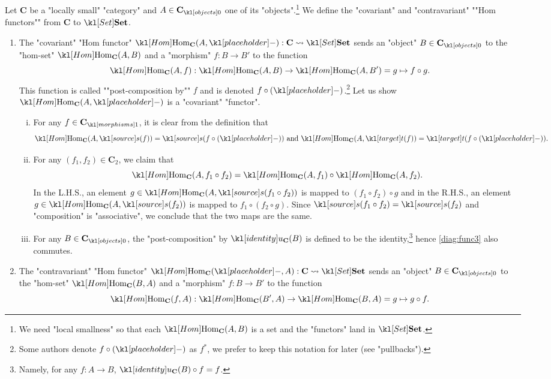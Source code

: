 \documentclass[main.tex]{subfiles}
\begin{document}
\begin{exmp}\label{exmp:homfunctor}
	\AP Let $\mathbf{C}$ be a "locally small" "category" and $A \in \obj{\mathbf{C}}$ one of its "objects".\footnote{We need "local smallness" so that each $\Hom_{\mathbf{C}}(A,B)$ is a set and the "functors" land in $\catSet$.} We define the "covariant" and "contravariant" ""Hom functors"" from $\mathbf{C}$ to $\catSet$.
	\begin{enumerate}
		\item The "covariant" "Hom functor" $\Hom_{\mathbf{C}}(A,\placeholder): \mathbf{C} \rightsquigarrow \catSet$ sends an "object" $B\in \obj{\mathbf{C}}$ to the "hom-set" $\Hom_{\mathbf{C}}(A,B)$ and a "morphism" $f:B\rightarrow B'$ to the function \[\Hom_{\mathbf{C}}(A,f): \Hom_{\mathbf{C}}(A,B) \rightarrow \Hom_{\mathbf{C}}(A,B') = g \mapsto f\circ g.\]
		\AP This function is called ""post-composition by"" $f$ and is denoted $f \circ (\placeholder)$.\footnote{Some authors denote $f \circ (\placeholder)$ as $f^*$, we prefer to keep this notation for later (see "pullbacks").} Let us show $\Hom_{\mathbf{C}}(A, \placeholder)$ is a "covariant" "functor".
		\begin{enumerate}[i.]
			\item For any $f \in \mor{\mathbf{C}}$, it is clear from the definition that \[\Hom_{\mathbf{C}}(A,\source(f)) = \source(f \circ (\placeholder)) \text{ and } \Hom_{\mathbf{C}}(A,\target(f)) = \target(f \circ (\placeholder)).\]
			\item For any $(f_1,f_2) \in \mathbf{C}_2$, we claim that \[\Hom_{\mathbf{C}}(A,f_1\circ f_2) = \Hom_{\mathbf{C}}(A,f_1)\circ \Hom_{\mathbf{C}}(A,f_2).\] In the L.H.S., an element $g \in \Hom_{\mathbf{C}}(A,\source(f_1\circ f_2))$ is mapped to $(f_1 \circ f_2) \circ g$ and in the R.H.S., an element $g \in \Hom_{\mathbf{C}}(A,\source(f_2))$ is mapped to $f_1\circ (f_2 \circ g)$. Since $\source(f_1 \circ f_2) = \source(f_2)$ and "composition" is "associative", we conclude that the two maps are the same.
			\item For any $B \in \obj{\mathbf{C}}$, the "post-composition" by $\idu_{\mathbf{C}}(B)$ is defined to be the identity,\footnote{Namely, for any $f: A \rightarrow B$, $\idu_{\mathbf{C}}(B) \circ f = f$.} hence \eqref{diag:func3} also commutes.
		\end{enumerate}
		\item The "contravariant" "Hom functor" $\Hom_{\mathbf{C}}(\placeholder,A): \mathbf{C} \rightsquigarrow \catSet$ sends an "object" $B\in \obj{\mathbf{C}}$ to the "hom-set" $\Hom_{\mathbf{C}}(B,A)$ and a "morphism" $f:B\rightarrow B'$ to the function \[\Hom_{\mathbf{C}}(f,A): \Hom_{\mathbf{C}}(B',A) \rightarrow \Hom_{\mathbf{C}}(B,A) = g \mapsto g\circ f.\]

\end{enumerate}
\end{exmp}
\end{document}
